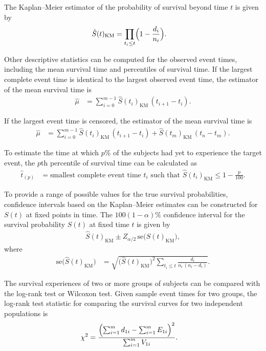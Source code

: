 \documentclass[
]{report}
\begin{document}
The Kaplan--Meier estimator of the probability of survival beyond time \(t\) is given by
\begin{align}
\hat S(t)_{\mathrm{KM}} &= \prod_{t_i \le t} \Bigl(1 - \frac{d_i}{n_i}\Bigr).
\end{align}

Other descriptive statistics can be computed for the observed event times, including the mean survival time and percentiles of survival time. If the largest complete event time is identical to the largest observed event time, the estimator of the mean survival time is
\begin{align}
\hat \mu &= \sum_{i=0}^{m-1} \hat S(t_i)_{\mathrm{KM}}\,(t_{i+1} - t_i).
\end{align}

If the largest event time is censored, the estimator of the mean survival time is
\begin{align}
\hat \mu &= \sum_{i=0}^{m-1} \hat S(t_i)_{\mathrm{KM}}\,(t_{i+1} - t_i)
+ \hat S(t_m)_{\mathrm{KM}}\,(t_n - t_m).
\end{align}

To estimate the time at which \(p\%\) of the subjects had yet to experience the target event, the \(p\)th percentile of survival time can be calculated as
\begin{align}
\hat t_{(p)} &= \text{smallest complete event time }t_i\text{ such that }
\hat S(t_i)_{\mathrm{KM}} \le 1 - \frac{p}{100}.
\end{align}

To provide a range of possible values for the true survival probabilities, confidence intervals based on the Kaplan--Meier estimates can be constructed for \(S(t)\) at fixed points in time. The \(100(1 - \alpha)\%\) confidence interval for the survival probability \(S(t)\) at fixed time \(t\) is given by
\begin{align}
\hat S(t)_{\mathrm{KM}} \pm Z_{\alpha/2}\,\mathrm{se}\bigl(\hat S(t)_{\mathrm{KM}}\bigr),
\end{align}
where
\begin{align}
\mathrm{se}\bigl(\hat S(t)_{\mathrm{KM}}\bigr)
&= \sqrt{
\bigl(\hat S(t)_{\mathrm{KM}}\bigr)^2 
\sum_{t_i \le t} \frac{d_i}{n_i\,(n_i - d_i)}
}.
\end{align}

The survival experiences of two or more groups of subjects can be compared with the log-rank test or Wilcoxon test. Given sample event times for two groups, the log-rank test statistic for comparing the survival curves for two independent populations is
\begin{align}
\chi^2 &= \frac{\Bigl(\sum_{i=1}^m d_{1i} - \sum_{i=1}^m E_{1i}\Bigr)^2}
{\sum_{i=1}^m V_{1i}}.
\end{align}
\end{document}
